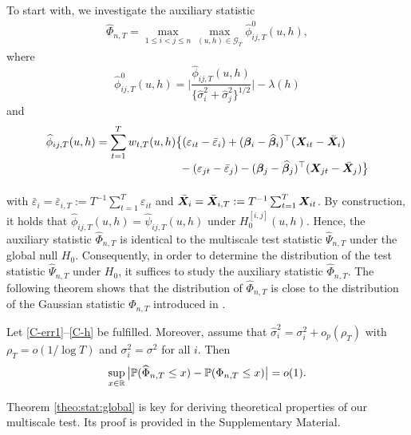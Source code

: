 \documentclass[12pt]{article}
\makeatletter
\renewcommand{\eqref}[1]{\tagform@{\ref{#1}}}
\makeatother
\begin{document}
To start with, we investigate the auxiliary statistic
\begin{align}\label{eq:Phi_hat}
\widehat{\Phi}_{n,T} = \max_{1 \le i < j \le n}  \max_{(u, h) \in \mathcal{G}_T} \widehat{\phi}^0_{ij, T}(u, h),
\end{align}
where
\begin{equation*}
\widehat{\phi}^0_{ij, T}(u, h) =\bigg| \frac{\widehat{\phi}_{ij, T}(u, h)} {\{ \widehat{\sigma}_i^2 + \widehat{\sigma}_j^2 \}^{1/2}} \bigg| - \lambda(h)
\end{equation*}
and
\begin{align*}
\widehat{\phi}_{ij, T}(u, h) 
 & = \sum_{t=1}^T w_{t,T}(u, h) \big\{ (\varepsilon_{it} - \bar{\varepsilon}_i) + (\bfbeta_i - \widehat{\bfbeta}_i)^\top (\X_{it} - \bar{\X}_{i}) \\[-0.4cm]
 & \phantom{= \sum_{t=1}^T w_{t,T}(u, h) \big\{} - (\varepsilon_{jt} - \bar{\varepsilon}_j) -  (\bfbeta_j - \widehat{\bfbeta}_j)^\top (\X_{jt} - \bar{\X}_{j}) \big\}
\end{align*}
with $\bar{\varepsilon}_i = \bar{\varepsilon}_{i,T} := T^{-1} \sum_{t=1}^T \varepsilon_{it}$ and $\bar{\boldsymbol{X}}_{i} =  \bar{\boldsymbol{X}}_{i, T} := T^{-1}\sum_{t=1}^T  \boldsymbol{X}_{it}$. By construction, it holds that $\widehat{\phi}_{ij, T}(u, h) = \widehat{\psi}_{ij, T}(u, h)$ under $H_0^{[i, j]}(u, h)$. Hence, the auxiliary statistic $\widehat{\Phi}_{n,T}$ is identical to the multiscale test statistic $\widehat{\Psi}_{n,T}$ under the global null $H_0$. Consequently, in order to determine the distribution of the test statistic $\widehat{\Psi}_{n,T}$ under $H_0$, it suffices to study the auxiliary statistic $\widehat{\Phi}_{n,T}$. The following theorem shows that the distribution of $\widehat{\Phi}_{n,T}$ is close to the distribution of the Gaussian statistic $\Phi_{n,T}$ introduced in \eqref{eq:Phi}. 
\begin{theorem}\label{theo:stat:global}
Let \ref{C-err1}--\ref{C-h} be fulfilled. Moreover, assume that $\widehat{\sigma}_i^2 = \sigma^2_i + o_p(\rho_T)$ with $\rho_T = o(1/\log T)$ and $\sigma_i^2 = \sigma^2$ for all $i$. Then  
\begin{equation*}
\sup_{x \in \mathbb{R}} \big| \mathbb{P}(\widehat{\Phi}_{n, T} \le x) - \mathbb{P}(\Phi_{n,T} \le x) \big| = o(1).
\end{equation*}
\end{theorem}
Theorem \ref{theo:stat:global} is key for deriving theoretical properties of our multiscale test. Its proof is provided in the Supplementary Material. 
\end{document}
